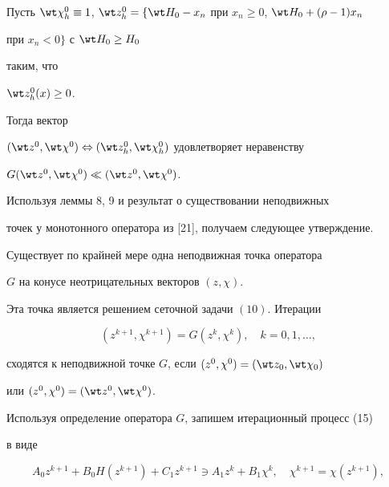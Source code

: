 \begin{lem}


Пусть $\wt \chi_h^0 \equiv 1$, $\wt z_h^0 =


\{ \wt H_0 - x_n$ при $x_n \geq 0$, $\wt H_0 + (\rho -1 )x_n$


при $x_n <0 \}$ с $\wt H_0 \geq H_0$


таким, что


$\wt z_h^0(x) \geq 0$.


Тогда вектор


$(\wt z^0, \wt \chi^0) \Leftrightarrow (\wt z^0_h,


\wt \chi^0_h)$ удовлетворяет неравенству


$G(\wt z^0, \wt \chi^0) \ll (\wt z^0, \wt \chi^0)$.


\end{lem}





Используя леммы 8, 9 и результат о существовании неподвижных


точек у монотонного оператора из [21], получаем следующее утверждение.





\begin{thm}


Существует по крайней мере одна неподвижная точка оператора


$G$ на конусе неотрицательных векторов $(z,\chi)$.


Эта точка является решением сеточной задачи $(10)$. Итерации


\begin{equation}\label{15}


(z^{k+1},\chi^{k+1})=G(z^k,\chi^k),\quad k=0,1,\dotsc,


\end{equation}


сходятся к неподвижной точке $G$, если $(z^0,\chi^0)=(\wt


z_0,\wt \chi_0)$


или $(z^0,\chi^0)=(\wt z^0,\wt \chi^0)$.


\end{thm}





Используя определение оператора $G$, запишем итерационный процесс (15)


в виде


\begin{equation}\label{16}


A_{0}z^{k+1}+B_{0}H(z^{k+1})+C_{1}z^{k+1} \ni A_{1}z^k+B_{1}\chi^k,\quad


\chi^{k+1}=\chi(z^{k+1}),


\end{equation}


